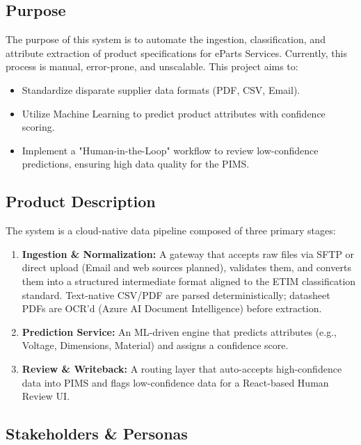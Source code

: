 \documentclass[12pt, a4paper]{article}
\begin{document}
\subsection{Purpose}
The purpose of this system is to automate the ingestion, classification, and attribute extraction of product specifications for eParts Services. Currently, this process is manual, error-prone, and unscalable. This project aims to:
\begin{itemize}
    \item Standardize disparate supplier data formats (PDF, CSV, Email).
    \item Utilize Machine Learning to predict product attributes with confidence scoring.
    \item Implement a "Human-in-the-Loop" workflow to review low-confidence predictions, ensuring high data quality for the PIMS.
\end{itemize}

\subsection{Product Description}
The system is a cloud-native data pipeline composed of three primary stages:
\begin{enumerate}
    \item \textbf{Ingestion \& Normalization:} A gateway that accepts raw files via SFTP or direct upload (Email and web sources planned), validates them, and converts them into a structured intermediate format aligned to the ETIM classification standard. Text-native CSV/PDF are parsed deterministically; datasheet PDFs are OCR'd (Azure AI Document Intelligence) before extraction.
    \item \textbf{Prediction Service:} An ML-driven engine that predicts attributes (e.g., Voltage, Dimensions, Material) and assigns a confidence score.
    \item \textbf{Review \& Writeback:} A routing layer that auto-accepts high-confidence data into PIMS and flags low-confidence data for a React-based Human Review UI.
\end{enumerate}

\subsection{Stakeholders \& Personas}
\end{document}
